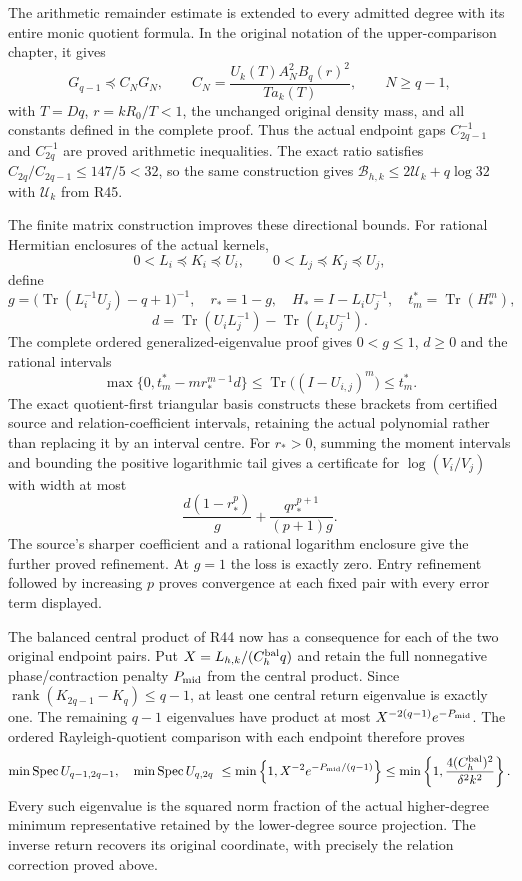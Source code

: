 The arithmetic remainder estimate is extended to every admitted
degree with its entire monic quotient formula. In the original
notation of the upper-comparison chapter, it gives
\[
 G_{q-1}\preceq C_NG_N,\qquad
 C_N=\frac{U_k(T)A_N^2B_q(r)^2}{T a_k(T)},\qquad
 N\ge q-1,
\]
with $T=Dq$, $r=kR_0/T<1$, the unchanged original density mass,
and all constants defined in the complete proof. Thus the actual
endpoint gaps $C_{2q-1}^{-1}$ and $C_{2q}^{-1}$ are proved
arithmetic inequalities. The exact ratio satisfies
$C_{2q}/C_{2q-1}\le147/5<32$, so the same construction gives
$\mathcal B_{h,k}\le2\mathcal U_k+q\log32$ with
$\mathcal U_k$ from R45.

The finite matrix construction improves these directional bounds.
For rational Hermitian enclosures of the actual kernels,
\[
 0<L_i\preceq K_i\preceq U_i,\qquad
 0<L_j\preceq K_j\preceq U_j,
\]
define
\[
 g=\bigl(\operatorname{Tr}(L_i^{-1}U_j)-q+1\bigr)^{-1},
 \quad r_*=1-g,\quad
 H_*=I-L_iU_j^{-1},\quad t_m^*=\operatorname{Tr}(H_*^m),
\]
\[
 d=\operatorname{Tr}(U_iL_j^{-1})
     -\operatorname{Tr}(L_iU_j^{-1}).
\]
The complete ordered generalized-eigenvalue proof gives
$0<g\le1$, $d\ge0$ and the rational intervals
\[
 \max\{0,t_m^*-m r_*^{m-1}d\}
 \le\operatorname{Tr}\bigl((I-U_{i,j})^m\bigr)\le t_m^*.
\]
The exact quotient-first triangular basis constructs these brackets
from certified source and relation-coefficient intervals, retaining
the actual polynomial rather than replacing it by an interval centre.
For $r_*>0$, summing the moment intervals and bounding the positive
logarithmic tail gives a certificate for $\log(V_i/V_j)$ with width
at most
\[
 \frac{d(1-r_*^p)}g+
 \frac{q r_*^{p+1}}{(p+1)g}.
\]
The source's sharper coefficient and a rational logarithm enclosure
give the further proved refinement. At $g=1$ the loss is exactly
zero. Entry refinement followed by increasing $p$ proves convergence
at each fixed pair with every error term displayed.

The balanced central product of R44 now has a consequence for each
of the two original endpoint pairs. Put
$X=L_{h,k}/(C_h^{\rm bal}q)$ and retain the full nonnegative
phase/contraction penalty $P_{\rm mid}$ from the central product.
Since $\operatorname{rank}(K_{2q-1}-K_q)\le q-1$, at least
one central return eigenvalue is exactly one. The remaining
$q-1$ eigenvalues have product at most
$X^{-2(q-1)}e^{-P_{\rm mid}}$. The ordered Rayleigh-quotient
comparison with each endpoint therefore proves
\[
 \min\operatorname{Spec}U_{q-1,2q-1},\quad
 \min\operatorname{Spec}U_{q,2q}
 \ \le\min\left\{1,X^{-2}e^{-P_{\rm mid}/(q-1)}\right\}
 \le\min\left\{1,\frac{4(C_h^{\rm bal})^2}{\delta^2k^2}\right\}.
\]
Every such eigenvalue is the squared norm fraction of the actual
higher-degree minimum representative retained by the lower-degree
source projection. The inverse return recovers its original
coordinate, with precisely the relation correction proved above.



